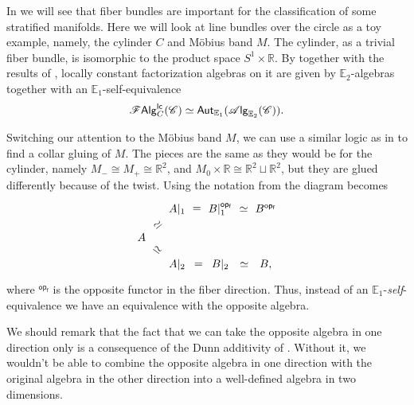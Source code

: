 \documentclass[../text]{subfiles}
\begin{document}
\begin{example}\label{ex:cylinder_mobius_band}
    In  we will see that fiber bundles are important for the classification of some stratified manifolds. Here we will look at line bundles over the circle as a toy example, namely, the cylinder $C$ and M\"obius band $M$. The cylinder, as a trivial fiber bundle, is isomorphic to the product space $S^1 \times \mathbb{R}$. By  together with the results of , locally constant factorization algebras on it are given by $\mathbb{E}_2$-algebras together with an $\mathbb{E}_1$-self-equivalence
    \begin{align}
        \mathscr{F} \mathsf{Alg}^{\mathsf{lc}}_C (\mathscr{C}) \simeq \mathsf{Aut}_{\mathbb{E}_1} (\mathscr{A} \mathsf{lg}_{\mathbb{E}_2} (\mathscr{C})).
    \end{align}

    Switching our attention to the M\"obius band $M$, we can use a similar logic as in  to find a collar gluing of $M$. The pieces are the same as they would be for the cylinder, namely $M_- \cong M_+ \cong \mathbb{R}^2$, and $M_0 \times \mathbb{R} \cong \mathbb{R}^2 \sqcup \mathbb{R}^2$, but they are glued differently because of the twist. Using the notation from  the diagram becomes
    \begin{equation}
        \begin{tikzcd}[row sep = small, column sep= small]
            & A|_1 \arrow[r, phantom, "=", description] & B|_1^{\mathsf{op_f}} \arrow[r, phantom, "\simeq", description] & B^{\mathsf{op_f}} \\
            A \arrow[ru, phantom, "\simeq", sloped, description] \arrow[rd, phantom, "\simeq", sloped, description] & & & \\
            & A|_2 \arrow[r, phantom, "=", description] & B|_2 \arrow[r, phantom, "\simeq", description] & B,
        \end{tikzcd}
    \end{equation}
    where $^{\mathsf{op_f}}$ is the opposite functor in the fiber direction. Thus, instead of an $\mathbb{E}_1$-\emph{self}-equivalence we have an equivalence with the opposite algebra.

    We should remark that the fact that we can take the opposite algebra in one direction only is a consequence of the Dunn additivity of . Without it, we wouldn't be able to combine the opposite algebra in one direction with the original algebra in the other direction into a well-defined algebra in two dimensions.
\end{example}
\end{document}
